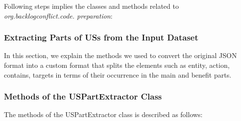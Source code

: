 Following steps implies the classes and methods related to \textit{org.backlogconflict.code. preparation}:
\subsubsection*{Extracting Parts of USs from the Input Dataset}\label{conflict_step_json_transformer}
In this section, we explain the methods we used to convert the original JSON format into a custom format that splits the elements such as entity, action, contains, targets in terms of their occurrence in the main and benefit parts. 
\subsubsection*{Methods of the USPartExtractor Class}
The methods of the USPartExtractor class is described as follows:
